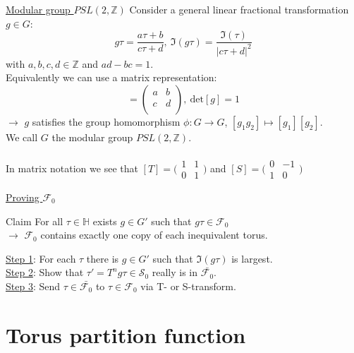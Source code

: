 \documentclass[11pt,aspectratio=169]{beamer}
\begin{document}
\begin{frame}{\underline{Modular group $PSL(2, \mathbb{Z})$}}
	Consider a general linear fractional transformation $g \in G$:
	\begin{equation}
		g\tau = \frac{a\tau + b}{c\tau + d},~\Im(g\tau) = \frac{\Im(\tau)}{|c\tau + d|^2}
	\end{equation}
	with $a, b, c, d \in \mathbb{Z}$ and $ad- bc = 1$.
	\\
	Equivalently we can use a matrix representation:
	\begin{equation}
		[g] = \begin{pmatrix}
			a & b \\
			c & d \\
		\end{pmatrix},~\textrm{det}[g] = 1
	\end{equation}
	$\rightarrow$ $g$ satisfies the group homomorphism $\phi : G \rightarrow G$, $[g_1 g_2] \mapsto [g_1][g_2]$.
	\\
	We call $G$ the modular group $PSL(2, \mathbb{Z})$.
	\\~\\
	In matrix notation we see that $[T] = \big(\begin{smallmatrix}
		1 & 1\\
		0 & 1
	  \end{smallmatrix}\big)$ and $[S] = \big(\begin{smallmatrix}
		0 & -1\\
		1 & 0
	  \end{smallmatrix}\big)$ 
\end{frame}

\begin{frame}{\underline{Proving $\mathcal{F}_0$}}
	\begin{block}{Claim}
		For all $\tau \in \mathbb{H}$ exists $g \in G'$ such that $g\tau \in \mathcal{F}_0$
		\\
		$\rightarrow$ $\mathcal{F}_0$ contains exactly one copy of each inequivalent torus.
	\end{block}
	\underline{Step 1}: For each $\tau$ there is $g \in G'$ such that $\Im(g\tau)$ is largest.
	\\
	\underline{Step 2}: Show that $\tau' = T^{n}g\tau \in \mathcal{S}_0$ really is in $\bar{\mathcal{F}_0}$.
	\\
	\underline{Step 3}: Send $\tau \in \bar{\mathcal{F}_0}$ to $\tau \in \mathcal{F}_0$ via T- or S-transform.
\end{frame}

\section{Torus partition function}
\end{document}
